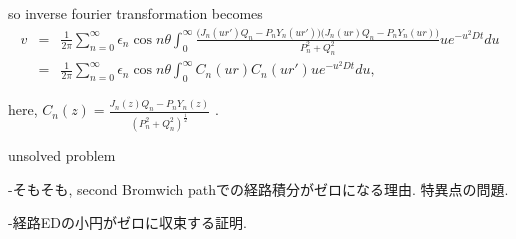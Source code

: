 \documentclass{article}
\begin{document}
so inverse fourier transformation becomes
\begin{eqnarray}
    v&=&\frac{1}{2\pi}\sum_{n=0}^{\infty}\epsilon_n\cos n\theta\int_{0}^{\infty}\frac{\bigl(J_n(ur')Q_n-P_nY_n(ur')\bigr)\bigl(J_n(ur)Q_n-P_nY_n(ur)\bigr)}{P_n^2+Q_n^2}ue^{-u^2Dt}du\\
     &=&\frac{1}{2\pi}\sum_{n=0}^{\infty}\epsilon_n\cos n\theta\int_{0}^{\infty}C_n(ur)C_n(ur')ue^{-u^2Dt}du ,
\end{eqnarray}

here, $C_n(z)=\frac{J_n(z)Q_n-P_nY_n(z)}{\left(P_n^2+Q_n^2\right)^{\frac{1}{2}}}$ .

unsolved problem

-そもそも, second Bromwich pathでの経路積分がゼロになる理由. 特異点の問題.

-経路EDの小円がゼロに収束する証明.
\end{document}
